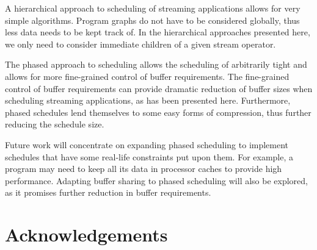 \documentclass{sig-alt-full}
\begin{document}
A hierarchical approach to scheduling of streaming applications allows
for very simple algorithms. Program graphs do not have to be
considered globally, thus less data needs to be kept track of.  In
the hierarchical approaches presented here, we only need to consider
immediate children of a given stream operator.

The phased approach to scheduling allows the scheduling of arbitrarily
tight {\feedbackloops} and allows for more fine-grained control of
buffer requirements. The fine-grained control of buffer requirements
can provide dramatic reduction of buffer sizes when scheduling
streaming applications, as has been presented here. Furthermore,
phased schedules lend themselves to some easy forms of compression,
thus further reducing the schedule size.

Future work will concentrate on expanding phased scheduling to
implement schedules that have some real-life constraints put upon
them. For example, a program may need to keep all its data in
processor caches to provide high performance.  Adapting buffer sharing
to phased scheduling will also be explored, as it promises further
reduction in buffer requirements.


\section{Acknowledgements}
\end{document}
